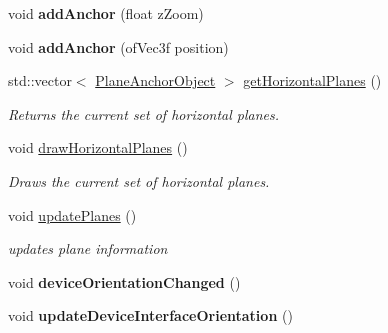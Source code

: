 \begin{DoxyCompactItemize}
\mbox{\label{class_a_r_processor_a6b6efec29e190aebd01bb770b6c218ed}} 
void {\bfseries add\+Anchor} (float z\+Zoom)
\item 
\mbox{\label{class_a_r_processor_af4e627093ee86883736c89c2a627af42}} 
void {\bfseries add\+Anchor} (of\+Vec3f position)
\item 
\mbox{\label{class_a_r_processor_a3cd70af245be375d56a06e2ea8d068f9}} 
std\+::vector$<$ \hyperlink{struct_a_r_objects_1_1_plane_anchor_object}{Plane\+Anchor\+Object} $>$ \hyperlink{class_a_r_processor_a3cd70af245be375d56a06e2ea8d068f9}{get\+Horizontal\+Planes} ()
\begin{DoxyCompactList}\small\item\em Returns the current set of horizontal planes. \end{DoxyCompactList}\item 
\mbox{\label{class_a_r_processor_a6a61a7e03821410bc1a715fd32159662}} 
void \hyperlink{class_a_r_processor_a6a61a7e03821410bc1a715fd32159662}{draw\+Horizontal\+Planes} ()
\begin{DoxyCompactList}\small\item\em Draws the current set of horizontal planes. \end{DoxyCompactList}\item 
\mbox{\label{class_a_r_processor_aaa1488d9082ec598fd4aeb5c5c43d999}} 
void \hyperlink{class_a_r_processor_aaa1488d9082ec598fd4aeb5c5c43d999}{update\+Planes} ()
\begin{DoxyCompactList}\small\item\em updates plane information \end{DoxyCompactList}\item 
\mbox{\label{class_a_r_processor_ac065970f90243b08b9d004a4220d0345}} 
void {\bfseries device\+Orientation\+Changed} ()
\item 
\mbox{\label{class_a_r_processor_a48797c1a249b2f115d0151396bc1eb9c}} 
void {\bfseries update\+Device\+Interface\+Orientation} ()
\item 
\mbox{\label{class_a_r_processor_a2514281144c680e13c02562c74746ceb}} 

\end{DoxyCompactItemize}
